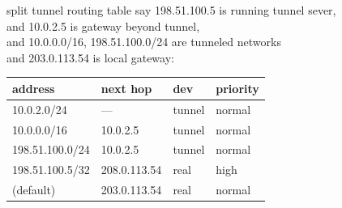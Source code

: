 \begin{frame}[fragile]{split tunnel routing table}
say 198.51.100.5 is running tunnel sever, \\
and 10.0.2.5  is gateway beyond tunnel, \\
and 10.0.0.0/16, 198.51.100.0/24 are tunneled networks \\
and 203.0.113.54 is local gateway: \\
\begin{tabular}{l|l|l|l}
address & next hop & dev & priority\\ \hline
10.0.2.0/24 & --- & tunnel & normal \\
10.0.0.0/16 & 10.0.2.5& tunnel & normal \\
198.51.100.0/24 & 10.0.2.5& tunnel & normal \\
198.51.100.5/32 & 208.0.113.54 & real & high\\
(default) & 203.0.113.54 & real & normal \\
\end{tabular}
\end{frame}




\begin{frame}
\end{frame}


\begin{frame}
\end{frame}
